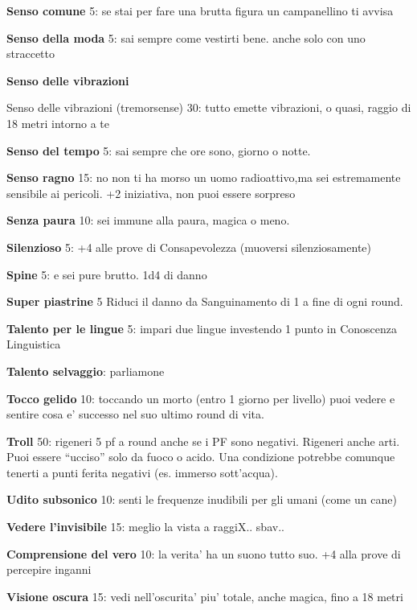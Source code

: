 \documentclass[a4paper,11pt,twoside,openany]{dndbook}
\begin{document}
\textbf{Senso comune} 5: se stai per fare una brutta figura un campanellino ti avvisa

\textbf{Senso della moda} 5: sai sempre come vestirti bene. anche solo con uno straccetto

\textbf{Senso delle vibrazioni} {Senso delle vibrazioni  (tremorsense) 30: tutto emette vibrazioni, o quasi, raggio di 18 metri intorno a te

\textbf{Senso del tempo} 5: sai sempre che ore sono, giorno o notte.

\textbf{Senso ragno} 15: no non ti ha morso un uomo radioattivo,ma sei estremamente sensibile ai pericoli. +2 iniziativa, non puoi essere sorpreso

\textbf{Senza paura} 10: sei immune alla paura, magica o meno.

\textbf{Silenzioso} 5: +4 alle prove di Consapevolezza (muoversi silenziosamente)

\textbf{Spine} 5: e sei pure brutto. 1d4 di danno

\textbf{Super piastrine} 5 Riduci il danno da Sanguinamento di 1 a fine di ogni round.

\textbf{Talento per le lingue} 5: impari due lingue investendo 1 punto in Conoscenza Linguistica

\textbf{Talento selvaggio}: parliamone

\textbf{Tocco gelido} 10: toccando un morto (entro 1 giorno per livello) puoi vedere e sentire cosa e' successo nel suo ultimo round di vita.

\textbf{Troll} 50: rigeneri 5 pf a round anche se i PF sono negativi. Rigeneri anche arti. Puoi essere ``ucciso'' solo da fuoco o acido. Una condizione potrebbe comunque tenerti a punti ferita negativi (es. immerso sott'acqua).

\textbf{Udito subsonico} 10: senti le frequenze inudibili per gli umani (come un cane)

\textbf{Vedere l'invisibile} 15: meglio la vista a raggiX.. sbav..

\textbf{Comprensione del vero} 10: la verita' ha un suono tutto suo. +4 alla prove di percepire inganni

\textbf{Visione oscura} 15: vedi nell'oscurita' piu' totale, anche magica, fino a 18 metri

}
\end{document}
